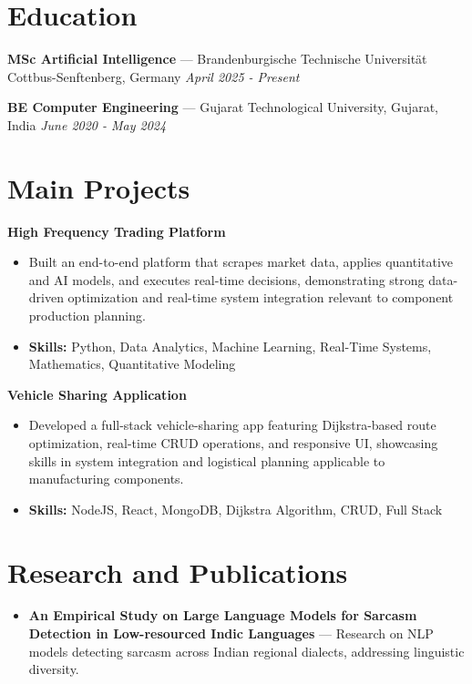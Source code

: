 \documentclass[a4paper,10pt]{article}
\begin{document}
\section*{Education}
\textbf{MSc Artificial Intelligence} — Brandenburgische Technische Universität Cottbus-Senftenberg, Germany \hfill \textit{April 2025 - Present}\par
\vspace{1.5pt}
\textbf{BE Computer Engineering} — Gujarat Technological University, Gujarat, India \hfill \textit{June 2020 - May 2024}\par

\section*{Main Projects}
\textbf{High Frequency Trading Platform}\par
\vspace{1pt}
\begin{itemize}
  \item Built an end-to-end platform that scrapes market data, applies quantitative and AI models, and executes real-time decisions, demonstrating strong data-driven optimization and real-time system integration relevant to component production planning.
  \item \textbf{Skills:} Python, Data Analytics, Machine Learning, Real-Time Systems, Mathematics, Quantitative Modeling
\end{itemize}
\vspace{3pt}
\textbf{Vehicle Sharing Application}\par
\vspace{1pt}
\begin{itemize}
  \item Developed a full-stack vehicle-sharing app featuring Dijkstra-based route optimization, real-time CRUD operations, and responsive UI, showcasing skills in system integration and logistical planning applicable to manufacturing components.
  \item \textbf{Skills:} NodeJS, React, MongoDB, Dijkstra Algorithm, CRUD, Full Stack
\end{itemize}

\section*{Research and Publications}
\begin{itemize}
\item \textbf{An Empirical Study on Large Language Models for Sarcasm Detection in Low-resourced Indic Languages} — Research on NLP models detecting sarcasm across Indian regional dialects, addressing linguistic diversity.
\end{itemize}
\end{document}
